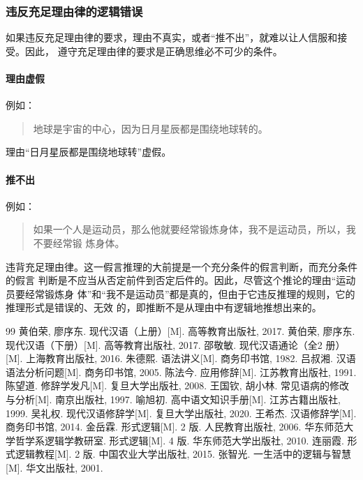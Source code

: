 \documentclass[final,oneside]{ctexbook}
\newenvironment{equotation}{\begin{quotation}\kaishu}{\end{quotation}}
\begin{document}
\subsubsection{违反充足理由律的逻辑错误}

如果违反充足理由律的要求，理由不真实，或者“推不出”，就难以让人信服和接受。因此，
遵守充足理由律的要求是正确思维必不可少的条件。

\paragraph{理由虚假}例如：
\begin{equotation}
  地球是宇宙的中心，因为日月星辰都是围绕地球转的。
\end{equotation}
理由“日月星辰都是围绕地球转”虚假。

\paragraph{推不出}例如：
\begin{equotation}
  如果一个人是运动员，那么他就要经常锻炼身体，我不是运动员，所以，我不要经常锻
  炼身体。
\end{equotation}
违背充足理由律。这一假言推理的大前提是一个充分条件的假言判断，而充分条件的假言
判断是不应当从否定前件到否定后件的。因此，尽管这个推论的理由“运动员要经常锻炼身
体”和“我不是运动员”都是真的，但由于它违反推理的规则，它的推理形式是错误的、无效
的，即推断不是从理由中有逻辑地推想出来的。

\backmatter

\begin{thebibliography}{99}
   黄伯荣, 廖序东. 现代汉语（上册）[M]. 高等教育出版社, 2017.
   黄伯荣, 廖序东. 现代汉语（下册）[M]. 高等教育出版社, 2017.
   邵敬敏. 现代汉语通论（全2 册）[M]. 上海教育出版社, 2016.
   朱德熙. 语法讲义[M]. 商务印书馆, 1982.
   吕叔湘. 汉语语法分析问题[M]. 商务印书馆, 2005.
   陈法今. 应用修辞[M]. 江苏教育出版社, 1991.
   陈望道. 修辞学发凡[M]. 复旦大学出版社, 2008.
   王国钦, 胡小林. 常见语病的修改与分析[M]. 南京出版社, 1997.
   喻旭初. 高中语文知识手册[M]. 江苏古籍出版社, 1999.
   吴礼权. 现代汉语修辞学[M]. 复旦大学出版社, 2020.
   王希杰. 汉语修辞学[M]. 商务印书馆, 2014.
   金岳霖. 形式逻辑[M]. 2 版. 人民教育出版社, 2006.
   华东师范大学哲学系逻辑学教研室. 形式逻辑[M]. 4 版. 华东师范大学出版社, 2010.
   连丽霞. 形式逻辑教程[M]. 2 版. 中国农业大学出版社, 2015.
   张智光. 一生活中的逻辑与智慧[M]. 华文出版社, 2001.
\end{thebibliography}

\printindex
\end{document}
